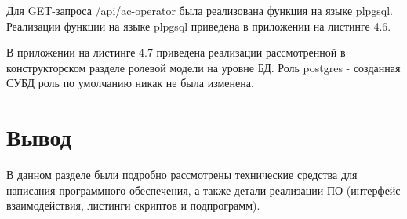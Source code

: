 Для GET-запроса /api/ac-operator была реализована функция на языке plpgsql. Реализации функции на языке plpgsql приведена в приложении на листинге 4.6.

В приложении на листинге 4.7 приведена реализации рассмотренной в конструкторском разделе ролевой модели на уровне БД. Роль postgres - созданная СУБД роль по умолчанию никак не была изменена.

\section*{Вывод}

В данном разделе были подробно рассмотрены технические средства для написания программного обеспечения, а также детали реализации ПО (интерфейс взаимодействия, листинги скриптов и подпрограмм).